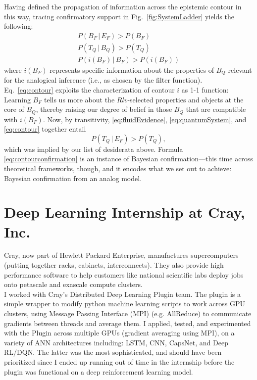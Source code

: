 \documentclass[11pt, oneside]{article}   	%
\begin{document}
Having defined the propagation of information across the epistemic contour in this way, tracing confirmatory support in Fig.\ \ref{fig:SystemLadder} yields the following:
\begin{eqnarray}
P(B_F \,|\, E_F ) > P(B_F)\label{eq:fluidEvidence}\\
P(T_Q \,|\, B_Q ) > P(T_Q)\label{eq:quantumSystem}\\
P(i(B_F) \,|\, B_F ) > P(i(B_F))\label{eq:contour}
\end{eqnarray}
where $i(B_F)$ represents specific information about the properties of $B_Q$ relevant for the analogical inference (i.e., as chosen by the filter function). Eq.\ \ref{eq:contour} exploits the characterization of contour $i$ as 1-1 function: Learning $B_F$ tells us more about the $Rlv$-selected properties and objects at the core of $B_Q$, thereby raising our degree of belief in those $B_Q$ that are compatible with $i(B_F)$. Now, by transitivity, \ref{eq:fluidEvidence}, \ref{eq:quantumSystem}, and \ref{eq:contour} together entail
\begin{equation}
P(T_Q \,|\, E_F ) > P(T_Q),\label{eq:contourconfirmation}
\end{equation}
which was implied by our list of desiderata above.  Formula \ref{eq:contourconfirmation} is an instance of Bayesian confirmation---this time across theoretical frameworks, though, and it encodes what we set out to achieve: Bayesian confirmation from an analog model.



\section{Deep Learning Internship at Cray, Inc.}

\noindent Cray, now part of Hewlett Packard Enterprise,  manufactures supercomputers (putting together racks, cabinets, interconnects). They also provide high performance software to help customers like national scientific labs deploy jobs onto petascale and exascale compute clusters. \\

\noindent I worked with Cray's Distributed Deep Learning Plugin team. The plugin is a simple wrapper to modify python machine learning scripts to work across GPU clusters, using Message Passing Interface (MPI) (e.g. AllReduce) to communicate gradients between threads and average them.  I applied, tested, and experimented with the Plugin across multiple GPUs (gradient averaging using MPI), on a variety of ANN architectures including: LSTM, CNN, CapsNet, and Deep RL/DQN.  The latter was the most sophisticated, and should have been prioritized since I ended up running out of time in the internship before the plugin was functional on a deep reinforcement learning model. \\
\end{document}
